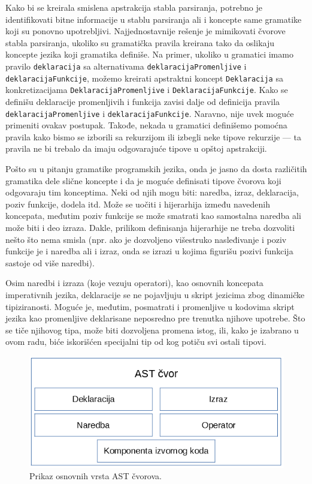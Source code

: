 Kako bi se kreirala smislena apstrakcija stabla parsiranja, potrebno je identifikovati bitne informacije u stablu parsiranja ali i koncepte same gramatike koji su ponovno upotrebljivi. Najjednostavnije rešenje je mimikovati čvorove stabla parsiranja, ukoliko su gramatička pravila kreirana tako da oslikaju koncepte jezika koji gramatika definiše. Na primer, ukoliko u gramatici imamo pravilo \texttt{deklaracija} sa alternativama \texttt{deklaracijaPromenljive} i \texttt{deklaracijaFunkcije}, možemo kreirati apstraktni koncept \texttt{Deklaracija} sa konkretizacijama \texttt{DeklaracijaPromenljive} i \texttt{DeklaracijaFunkcije}. Kako se definišu deklaracije promenljivih i funkcija zavisi dalje od definicija pravila \texttt{deklaracijaPromenljive} i \texttt{deklaracijaFunkcije}. Naravno, nije uvek moguće primeniti ovakav postupak. Takođe, nekada u gramatici definišemo pomoćna pravila kako bismo se izborili sa rekurzijom ili izbegli neke tipove rekurzije --- ta pravila ne bi trebalo da imaju odgovarajuće tipove u opštoj apstrakciji. 

Pošto su u pitanju gramatike programskih jezika, onda je jasno da dosta različitih gramatika dele slične koncepte i da je moguće definisati tipove čvorova koji odgovaraju tim konceptima. Neki od njih mogu biti: naredba, izraz, deklaracija, poziv funkcije, dodela itd. Može se uočiti i hijerarhija između navedenih koncepata, međutim poziv funkcije se može smatrati kao samostalna naredba ali može biti i deo izraza. Dakle, prilikom definisanja hijerarhije ne treba dozvoliti nešto što nema smisla (npr. ako je dozvoljeno višestruko nasleđivanje i poziv funkcije je i naredba ali i izraz, onda se izrazi u kojima figurišu pozivi funkcija sastoje od više naredbi).

Osim naredbi i izraza (koje vezuju operatori), kao osnovnih koncepata imperativnih jezika, deklaracije se ne pojavljuju u skript jezicima zbog dinamičke tipiziranosti. Moguće je, međutim, posmatrati i promenljive u kodovima skript jezika kao promenljive deklarisane neposredno pre trenutka njihove upotrebe. Što se tiče njihovog tipa, može biti dozvoljena promena istog, ili, kako je izabrano u ovom radu, biće iskorišćen specijalni tip od kog potiču svi ostali tipovi.

\begin{figure}[h!]
\centering
\includegraphics[scale=0.6]{images/nodes.png}
\caption{Prikaz osnovnih vrsta AST čvorova.}
\label{fig:ASTNode}
\end{figure}

